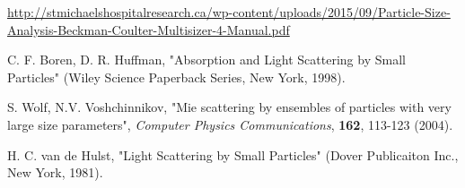 \documentclass[a4paper, 11pt]{report}
\newcommand\blankpage{%
    \null
    \thispagestyle{empty}%
    \addtocounter{page}{-1}%
    \newpage}
\begin{document}

\begin{thebibliography}{99}

 \url{http://stmichaelshospitalresearch.ca/wp-content/uploads/2015/09/Particle-Size-Analysis-Beckman-Coulter-Multisizer-4-Manual.pdf}

 C. F. Boren, D. R. Huffman, "Absorption and Light Scattering by Small Particles" (Wiley Science Paperback Series, New York, 1998).

 S. Wolf, N.V. Voshchinnikov, "Mie scattering by ensembles of particles with very large size parameters", \textit{Computer Physics Communications}, \textbf{162}, 113-123 (2004).

 H. C. van de Hulst, "Light Scattering by Small Particles" (Dover Publicaiton Inc., New York, 1981).

\end{thebibliography}

\newpage
\thispagestyle{plain}
\thispagestyle{empty}
\afterpage{\blankpage}


\end{document}
